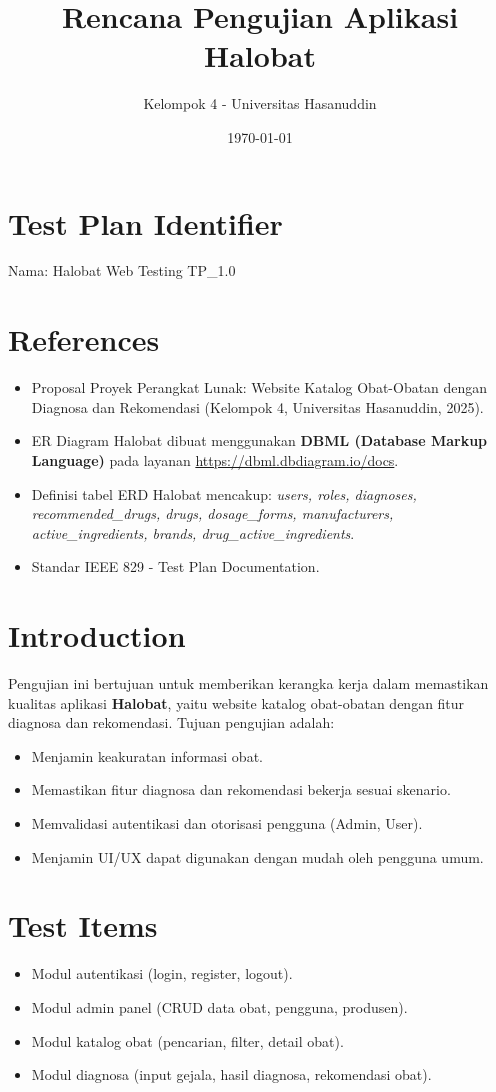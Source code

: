 \documentclass[12pt,a4paper]{article}
\title{Rencana Pengujian Aplikasi Halobat}
\author{Kelompok 4 - Universitas Hasanuddin}
\date{\today}
\begin{document}
\maketitle
\tableofcontents
\newpage

\section{Test Plan Identifier}
Nama: Halobat Web Testing TP\_1.0

\section{References}
\begin{itemize}
    \item Proposal Proyek Perangkat Lunak: Website Katalog Obat-Obatan dengan Diagnosa dan Rekomendasi (Kelompok 4, Universitas Hasanuddin, 2025).
    \item ER Diagram Halobat dibuat menggunakan \textbf{DBML (Database Markup Language)} pada layanan \url{https://dbml.dbdiagram.io/docs}. 
    \item Definisi tabel ERD Halobat mencakup: \textit{users, roles, diagnoses, recommended\_drugs, drugs, dosage\_forms, manufacturers, active\_ingredients, brands, drug\_active\_ingredients}.
    \item Standar IEEE 829 - Test Plan Documentation.
\end{itemize}


\section{Introduction}
Pengujian ini bertujuan untuk memberikan kerangka kerja dalam memastikan kualitas aplikasi \textbf{Halobat}, yaitu website katalog obat-obatan dengan fitur diagnosa dan rekomendasi. 
Tujuan pengujian adalah:
\begin{itemize}
    \item Menjamin keakuratan informasi obat.
    \item Memastikan fitur diagnosa dan rekomendasi bekerja sesuai skenario.
    \item Memvalidasi autentikasi dan otorisasi pengguna (Admin, User).
    \item Menjamin UI/UX dapat digunakan dengan mudah oleh pengguna umum.
\end{itemize}

\section{Test Items}
\begin{itemize}
    \item Modul autentikasi (login, register, logout).
    \item Modul admin panel (CRUD data obat, pengguna, produsen).
    \item Modul katalog obat (pencarian, filter, detail obat).
    \item Modul diagnosa (input gejala, hasil diagnosa, rekomendasi obat).
\end{itemize}
\end{document}
